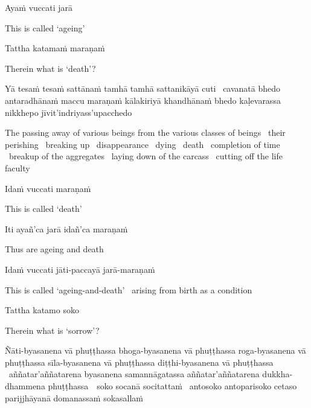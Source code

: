 Ayaṁ vuccati jarā

\begin{english}
  This is called `ageing'
\end{english}

Tattha katamaṁ maraṇaṁ

\begin{english}
  Therein what is `death'?
\end{english}

\begin{pali-hang}
  Yā tesaṁ tesaṁ sattānaṁ tamhā tamhā sattanikāyā cuti \breathmark\ cavanatā bhedo antaradhānaṁ maccu maraṇaṁ kālakiriyā khandhānaṁ bhedo kaḷevarassa nikkhepo jīvit'indriyass'upacchedo
\end{pali-hang}

\begin{english-hang-verses}
  The passing away of various beings from the various classes of beings \breathmark\ their perishing \breathmark\ breaking up \breathmark\ disappearance \breathmark\ dying \breathmark\ death \breathmark\ completion of time \breathmark\ breakup of the aggregates \breathmark\ laying down of the carcass \breathmark\ cutting off the life faculty
\end{english-hang-verses}

Idaṁ vuccati maraṇaṁ

\begin{english}
  This is called `death'
\end{english}

Iti ayañ'ca jarā idañ'ca maraṇaṁ

\begin{english}
  Thus are ageing and death
\end{english}

Idaṁ vuccati jāti-paccayā jarā-maraṇaṁ

\begin{english}
  This is called `ageing-and-death' \breathmark\ arising from birth as a condition
\end{english}

Tattha katamo soko

\begin{english}
  Therein what is `sorrow'?
\end{english}

\begin{pali-hang}
  Ñāti-byasanena vā phuṭṭhassa bhoga-byasanena vā phuṭṭhassa roga-byasanena vā phuṭṭhassa sīla-byasanena vā phuṭṭhassa diṭṭhi-byasanena vā phuṭṭhassa \breathmark\ aññatar'aññatarena byasanena samannāgatassa aññatar'aññatarena dukkha-dhammena \mbox{phuṭṭhassa}~\breathmark\ soko socanā socitattaṁ \breathmark\ antosoko antoparisoko cetaso parijjhāyanā domanassaṁ sokasallaṁ
\end{pali-hang}

